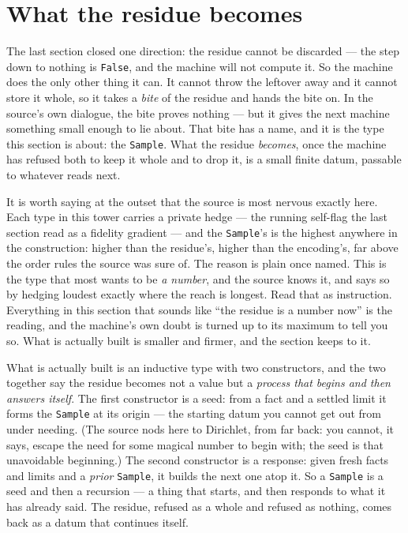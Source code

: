 \section{What the residue becomes}

The last section closed one direction: the residue cannot be discarded --- the step down to nothing is \verb|False|,
and the machine will not compute it. So the machine does the only other thing it can. It cannot throw the leftover away
and it cannot store it whole, so it takes a \emph{bite} of the residue and hands the bite on. In the source's own
dialogue, the bite proves nothing --- but it gives the next machine something small enough to lie about. That bite has
a name, and it is the type this section is about: the \verb|Sample|. What the residue \emph{becomes}, once the machine
has refused both to keep it whole and to drop it, is a small finite datum, passable to whatever reads next.

It is worth saying at the outset that the source is most nervous exactly here. Each type in this tower carries a
private hedge --- the running self-flag the last section read as a fidelity gradient --- and the \verb|Sample|'s is the
highest anywhere in the construction: higher than the residue's, higher than the encoding's, far above the order rules
the source was sure of. The reason is plain once named. This is the type that most wants to be \emph{a number}, and the
source knows it, and says so by hedging loudest exactly where the reach is longest. Read that as instruction.
Everything in this section that sounds like ``the residue is a number now'' is the reading, and the machine's own doubt
is turned up to its maximum to tell you so. What is actually built is smaller and firmer, and the section keeps to it.

What is actually built is an inductive type with two constructors, and the two together say the residue becomes not a
value but a \emph{process that begins and then answers itself}. The first constructor is a seed: from a fact and a
settled limit it forms the \verb|Sample| at its origin --- the starting datum you cannot get out from under needing.
(The source nods here to Dirichlet, from far back: you cannot, it says, escape the need for some magical number to
begin with; the seed is that unavoidable beginning.) The second constructor is a response: given fresh facts and limits
and a \emph{prior} \verb|Sample|, it builds the next one atop it. So a \verb|Sample| is a seed and then a recursion ---
a thing that starts, and then responds to what it has already said. The residue, refused as a whole and refused as
nothing, comes back as a datum that continues itself.


